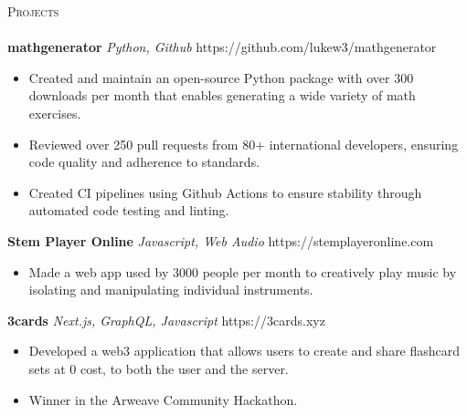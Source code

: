 \documentclass[letterpaper]{article}
\newcommand{\lineunder} {
    \vspace*{-8pt} \\
    \hspace*{-18pt} \hrulefill \\
}
\newcommand{\header} [1] {
    {\hspace*{-18pt}\vspace*{6pt} \textsc{#1}}
    \vspace*{-6pt} \lineunder
}
\begin{document}
\header{Projects}

    {\textbf{mathgenerator}} {\sl Python, Github} \hfill https://github.com/lukew3/mathgenerator\\
    \vspace{-2mm}
    \begin{itemize} \itemsep -1mm
    
        \item Created and maintain an open-source Python package with over 300 downloads per month that enables generating a wide variety of math exercises.

        \item Reviewed over 250 pull requests from 80+ international developers, ensuring code quality and adherence to standards.

        \item Created CI pipelines using Github Actions to ensure stability through automated code testing and linting.

    \end{itemize}
    \vspace{-2mm}

    {\textbf{Stem Player Online}} {\sl Javascript, Web Audio} \hfill https://stemplayeronline.com\\
    \vspace{-2mm}
    \begin{itemize} \itemsep -1mm

        \item Made a web app used by 3000 people per month to creatively play music by isolating and manipulating individual instruments.
        
    \end{itemize}
    \vspace{-2mm}

    {\textbf{3cards}} {\sl Next.js, GraphQL, Javascript} \hfill https://3cards.xyz\\
    \vspace{-2mm}
    \begin{itemize} \itemsep -1mm

        \item Developed a web3 application that allows users to create and share flashcard sets at 0 cost, to both the user and the server.
        \item Winner in the Arweave Community Hackathon.
            
    \end{itemize}
    \vspace{-2mm}
\end{document}
